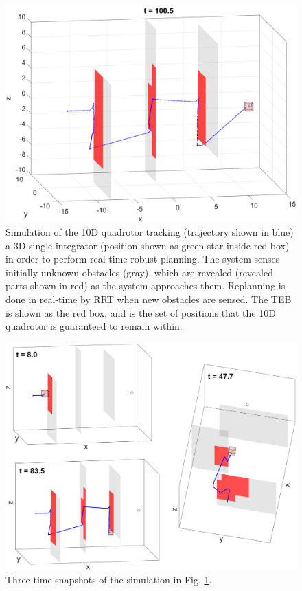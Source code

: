 \begin{figure}
  \includegraphics[width=\columnwidth]{fig/Q10D_Q3D/10050}
  \caption{Simulation of the 10D quadrotor tracking (trajectory shown in blue) a 3D single integrator (position shown as green star inside red box) in order to perform real-time robust planning. The system senses initially unknown obstacles (gray), which are revealed (revealed parts shown in red) as the system approaches them. Replanning is done in real-time by RRT when new obstacles are sensed. The TEB is shown as the red box, and is the set of positions that the 10D quadrotor is guaranteed to remain within.}
  \label{fig:simRRT}
\end{figure}

\begin{figure}
  \includegraphics[width=\columnwidth]{fig/Q10D_Q3D/combined}
  \caption{Three time snapshots of the simulation in Fig. \ref{fig:simRRT}.}
  \label{fig:simRRT_combined}  
\end{figure}

